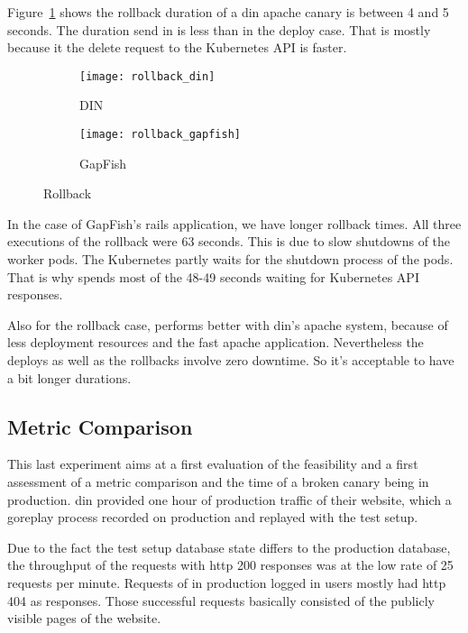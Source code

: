 Figure~\ref{fig:rollback_din} shows the rollback duration of a \gls{din} apache canary
is between 4 and 5 seconds. The duration send in \deployer is less than in the deploy case.
That is mostly because it the delete request to the Kubernetes API is faster.

\begin{figure}[htbp]
  \centering
  \begin{subfigure}{.5\textwidth}
    \texttt{[image: rollback\_din]}
    \caption[DIN]{DIN}
    \label{fig:rollback_din}
  \end{subfigure}%
  \begin{subfigure}{.5\textwidth}
    \texttt{[image: rollback\_gapfish]}
    \caption[GapFish]{GapFish}
    \label{fig:rollback_gapfish}
  \end{subfigure}
  \caption[Deploy]{Rollback}
\end{figure}

In the case of GapFish's rails application, we have longer rollback times. All three
executions of the rollback were 63 seconds. This is due to slow shutdowns of the worker
pods. The Kubernetes partly waits for the shutdown process of the pods. That is why
\deployer spends most of the 48-49 seconds waiting for Kubernetes API responses.

Also for the rollback case, \deployer performs better with \gls{din}'s apache system, because of
less deployment resources and the fast apache application. Nevertheless the deploys as
well as the rollbacks involve zero downtime. So it's acceptable to have a bit longer
durations.

\subsection{Metric Comparison}
\label{sec:eval_metrics}

This last experiment aims at a first evaluation of the feasibility and a first assessment
of a metric comparison and the time of a broken canary being in production. \gls{din}
provided one hour of production traffic of their website, which a goreplay process
recorded on production and replayed with the test setup.

Due to the fact the test setup database state differs to the production database, the
throughput of the requests with http 200 responses was at the low rate of 25 requests per
minute. Requests of in production logged in users mostly had http 404 as responses. Those
successful requests basically consisted of the publicly visible pages of the website.


